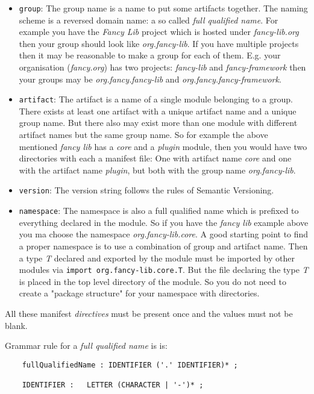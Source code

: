 \documentclass[a4paper,12pt]{report}
\begin{document}
\begin{itemize}
    \item \verb|group|: The group name is a name to put some artifacts together. The naming scheme is a reversed domain name: a so called \textit{full qualified name}. For example you have the \textit{Fancy Lib} project which is hosted under \textit{fancy-lib.org} then your group should look like \textit{org.fancy-lib}. If you have multiple projects then it may be reasonable to make a group for each of them. E.g. your organisation (\textit{fancy.org}) has two projects: \textit{fancy-lib} and \textit{fancy-framework} then your groups may be \textit{org.fancy.fancy-lib} and \textit{org.fancy.fancy-framework}.
    \item \verb|artifact|: The artifact is a name of a single module belonging to a group. There exists at least one artifact with a unique artifact name and a unique group name. But there also may exist more than one module with different artifact names but the same group name. So for example the above mentioned \textit{fancy lib} has a \textit{core} and a \textit{plugin} module, then you would have two directories with each a manifest file: One with artifact name \textit{core} and one with the artifact name \textit{plugin}, but both with the group name \textit{org.fancy-lib}.
    \item \verb|version|: The version string follows the rules of Semantic Versioning\cite{semver}.
    \item \verb|namespace|: The namespace is also a full qualified name which is prefixed to everything declared in the module. So if you have the \textit{fancy lib} example above you ma choose the namespace \textit{org.fancy-lib.core}. A good starting point to find a proper namespace is to use a combination of group and artifact name. Then a type \textit{T} declared and exported by the module must be imported by other modules via \verb|import org.fancy-lib.core.T|. But the file declaring the type \textit{T} is placed in the top level directory of the module. So you do not need to create a "package structure" for your namespace with directories. 
\end{itemize}

All these manifest \textit{directives} must be present once and the values must not be blank.

Grammar rule for a \textit{full qualified name} is is: 
\begin{verbatim}
    fullQualifiedName : IDENTIFIER ('.' IDENTIFIER)* ;
    
    IDENTIFIER :   LETTER (CHARACTER | '-')* ;
\end{verbatim}
\end{document}
